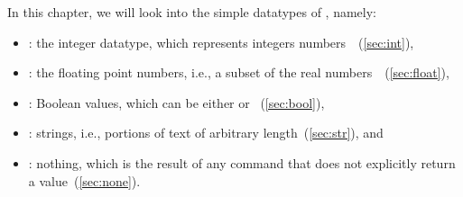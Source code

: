 In this chapter, we will look into the simple datatypes of \python, namely:%
%
\begin{itemize}%
%
\item {}: the integer datatype, which represents integers numbers~\integerNumbers~(\cref{sec:int}),%
\item {}: the floating point numbers, i.e., a subset of the real numbers~\realNumbers~(\cref{sec:float}),%
\item {}: Boolean values, which can be either  or ~(\cref{sec:bool}),%
\item {}: strings, i.e., portions of text of arbitrary length~(\cref{sec:str}), and%
\item {}: nothing, which is the result of any command that does not explicitly return a value~(\cref{sec:none}).%
%
\end{itemize}%
%
\endhsection%
%
